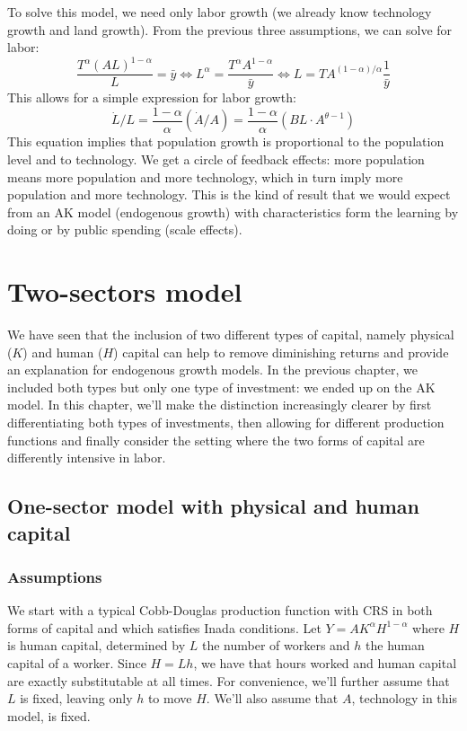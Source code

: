 \documentclass[12pt]{report}
\begin{document}
To solve this model, we need only labor growth (we already know technology growth and land growth). From the previous three assumptions, we can solve for labor: $$ \frac{T^\alpha (AL)^{1-\alpha}}{L} = \bar y \Leftrightarrow L^\alpha = \frac{T^\alpha A^{1-\alpha}}{\bar y}  \Leftrightarrow L = T A^{(1-\alpha)/\alpha}\frac{1}{\bar y} $$ This allows for a simple expression for labor growth: $$\dot L/L = \frac{1-\alpha}{\alpha} \left(\dot A/A\right) = \frac{1-\alpha}{\alpha} \left( B L \cdot A^{\theta - 1} \right) $$ This equation implies that population growth is proportional to the population level and to technology. We get a circle of feedback effects: more population means more population and more technology, which in turn imply more population and more technology. This is the kind of result that we would expect from an AK model (endogenous growth) with characteristics form the learning by doing or by public spending (scale effects).

\chapter{Two-sectors model}

We have seen that the inclusion of two different types of capital, namely physical ($K$) and human ($H$) capital can help to remove diminishing returns and provide an explanation for endogenous growth models. In the previous chapter, we included both types but only one type of investment: we ended up on the AK model. In this chapter, we'll make the distinction increasingly clearer by first differentiating both types of investments, then allowing for different production functions and finally consider the setting where the two forms of capital are differently intensive in labor.

\section{One-sector model with physical and human capital}

\subsection{Assumptions}

We start with a typical Cobb-Douglas production function with CRS in both forms of capital and which satisfies Inada conditions. Let $Y = AK^\alpha H^{1 - \alpha}$ where $H$ is human capital, determined by $L$ the number of workers and $h$ the human capital of a worker. Since $H = Lh$, we have that hours worked and human capital are exactly substitutable at all times. For convenience, we'll further assume that $L$ is fixed, leaving only $h$ to move $H$. We'll also assume that $A$, technology in this model, is fixed.
\end{document}
